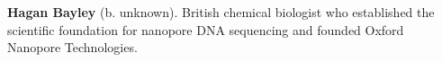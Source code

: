 \textbf{Hagan Bayley} (b. unknown). British chemical biologist who established the scientific foundation for nanopore DNA sequencing and founded Oxford Nanopore Technologies.

